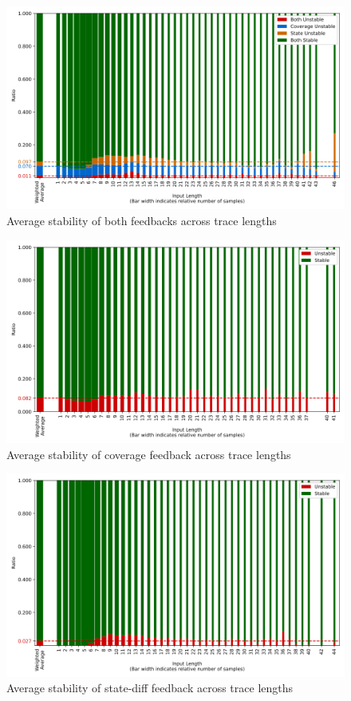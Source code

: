 \documentclass[twocolumn]{article}
\begin{document}
\begin{figure}[htb]
  \includegraphics[width=\columnwidth]{assets/consistency/both-observer-ratios-by-len.png}
  \caption{Average stability of both feedbacks across trace lengths}
  \label{fig:both-inter}
\end{figure}
\begin{figure}[htb]
  \includegraphics[width=\columnwidth]{assets/consistency/coverage-observer-ratios-by-len.png}
  \caption{Average stability of coverage feedback across trace lengths}
  \label{fig:cov-inter}
\end{figure}
\begin{figure}[htb]
  \includegraphics[width=\columnwidth]{assets/consistency/state-diff-observer-ratios-by-len.png}
  \caption{Average stability of state-diff feedback across trace lengths}
  \label{fig:state-diff-inter}
\end{figure}
\end{document}
